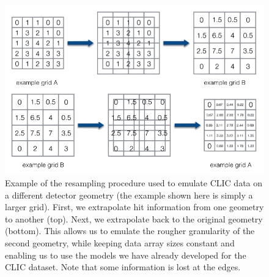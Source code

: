 \begin{figure}[htbp]
    \centering
    \includegraphics[scale=0.3, clip]{Images/Calo/resampling.png}
    \caption{Example of the resampling procedure used to emulate CLIC data on a different detector geometry (the example shown here is simply a larger grid). First, we extrapolate hit information from one geometry to another (top). Next, we extrapolate back to the original geometry (bottom). This allows us to emulate the rougher granularity of the second geometry, while keeping data array sizes constant and enabling us to use the models we have already developed for the CLIC dataset. Note that some information is lost at the edges.}
    \label{fig:resampling}
\end{figure}


